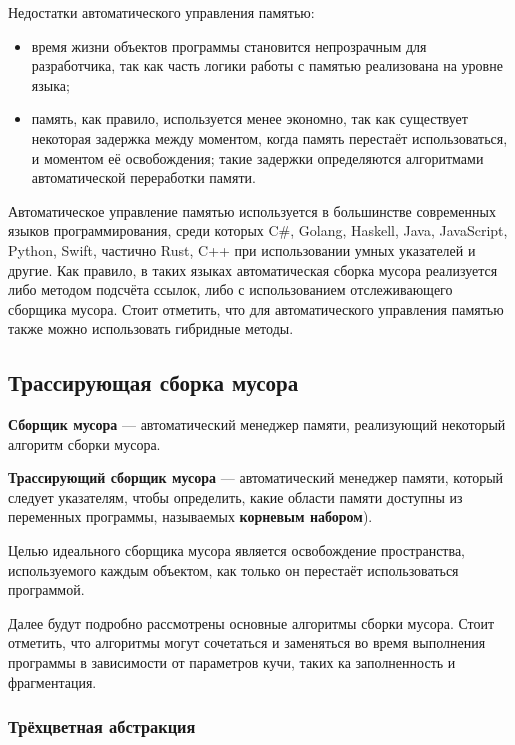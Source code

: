Недостатки автоматического управления памятью: 

\begin{itemize}[label*=---]
	\item время жизни объектов программы становится непрозрачным для разработчика, так как часть логики работы с памятью реализована на уровне языка;
	\item память, как правило, используется менее экономно, так как существует некоторая задержка между моментом, когда память перестаёт использоваться, и моментом её освобождения; такие задержки определяются алгоритмами автоматической переработки памяти.
\end{itemize}

Автоматическое управление памятью используется в большинстве современных языков программирования, среди которых C\#, Golang, Haskell, Java, JavaScript, Python, Swift, частично Rust, C++ при использовании умных указателей и другие. Как правило, в таких языках автоматическая сборка мусора реализуется либо методом подсчёта ссылок, либо с использованием отслеживающего сборщика мусора. \cite{recycling} Стоит отметить, что для автоматического управления памятью также можно использовать гибридные методы. \cite{cornell2} \cite{urc}



\subsection{Трассирующая сборка мусора}

\textbf{Сборщик мусора} \cite{glossary} --- автоматический менеджер памяти, реализующий некоторый алгоритм сборки мусора.

\textbf{Трассирующий сборщик мусора} \cite{recycling} --- автоматический менеджер памяти, который следует указателям, чтобы определить, какие области памяти доступны из переменных программы, называемых \textbf{корневым набором}).

Целью идеального сборщика мусора является освобождение пространства, используемого каждым объектом, как только он перестаёт использоваться программой.

Далее будут подробно рассмотрены основные алгоритмы сборки мусора. Стоит отметить, что алгоритмы могут сочетаться и заменяться во время выполнения программы в зависимости от параметров кучи, таких ка заполненность и фрагментация. \cite{handbook}

\subsubsection{Трёхцветная абстракция}

